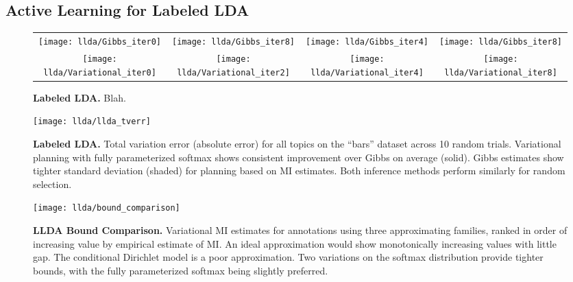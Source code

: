 \subsection{Active Learning for Labeled LDA}\label{sec:llda}

\begin{figure*}
  \begin{tabular}{cccc}
    \texttt{[image: llda/Gibbs\_iter0]} &
    \texttt{[image: llda/Gibbs\_iter8]} &
    \texttt{[image: llda/Gibbs\_iter4]} &
    \texttt{[image: llda/Gibbs\_iter8]} \\
    
    \texttt{[image: llda/Variational\_iter0]} &
    \texttt{[image: llda/Variational\_iter2]} &
    \texttt{[image: llda/Variational\_iter4]} &
    \texttt{[image: llda/Variational\_iter8]}
  \end{tabular}
  \caption{\small\textbf{Labeled LDA.} Blah.}
\end{figure*}

\begin{figure}
  \centering
  \texttt{[image: llda/llda\_tverr]} \vspace{-2mm}
  
  \caption{\small\textbf{Labeled LDA.} Total variation error (absolute
  error) for all topics on the ``bars'' dataset across 10 random
  trials.  Variational planning with fully parameterized softmax shows
  consistent improvement over Gibbs on average (solid).  Gibbs
  estimates show tighter standard deviation (shaded) for planning
  based on MI estimates.  Both inference methods perform similarly
  for random selection.}
  
  \label{fig:llda_tv}
\end{figure}

\begin{figure}
  \centering
  \texttt{[image: llda/bound\_comparison]}
  
  \caption{\small\textbf{LLDA Bound Comparison.} Variational MI
  estimates for annotations using three approximating families, ranked
  in order of increasing value by empirical estimate of MI.  An ideal
  approximation would show monotonically increasing values with little
  gap.  The conditional Dirichlet model is a poor approximation.  Two
  variations on the softmax distribution provide tighter bounds, with
  the fully parameterized softmax being slightly
  preferred.}  \label{fig:llda_bound}
\end{figure}

